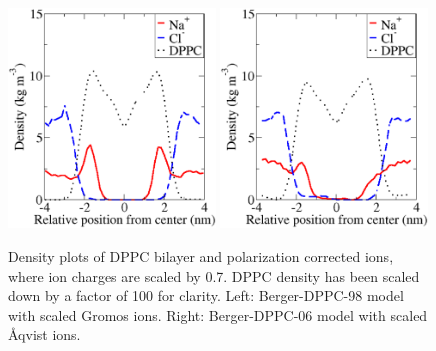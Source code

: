 \documentclass[pre,aps,floatfix,authordate1-4,twocolumn]{revtex4-1}
\begin{document}
\begin{figure}[]
  \centering
  \includegraphics[width=0.49\textwidth]{../Fig/ionscaledberger98.eps} %
  \includegraphics[width=0.49\textwidth]{../Fig/ionscaledberger06.eps} %
  \caption{\label{ionscaled}
   Density plots of DPPC bilayer and polarization corrected ions, where ion charges are scaled by 0.7. DPPC density has been scaled down by a factor of 100 for clarity. Left: Berger-DPPC-98 model with scaled Gromos ions. Right: Berger-DPPC-06 model with scaled \r{A}qvist ions.
   }
\end{figure}



\end{document}
